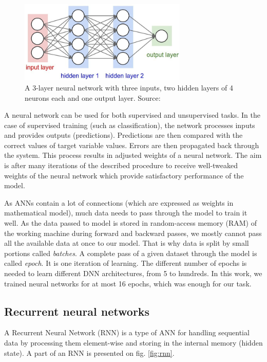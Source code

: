 \begin{figure}[h]
    \centering
    \includegraphics[width=8cm]{Images/Neural-network.jpg}
    \caption{A 3-layer neural network with three inputs, two hidden layers of 4 neurons each and one output layer. Source: \citep{FeiFei-2016}}
    \label{fig:neural-net}
\end{figure} 

A neural network can be used for both supervised and unsupervised tasks. In the case of supervised training (such as classification), the network processes inputs and provides outputs (predictions). Predictions are then compared with the correct values of target variable values. Errors are then propagated back through the system. This process results in adjusted weights of a neural network. The aim is after many iterations of the described procedure to receive well-tweaked weights of the neural network which provide satisfactory performance of the model. 

As ANNs contain a lot of connections (which are expressed as weights in mathematical model), much data needs to pass through the model to train it well. As the data passed to model is stored in random-access memory (RAM) of the working machine during forward and backward passes, we mostly cannot pass all the available data at once to our model. That is why data is split by small portions called \textit{batches}. A complete pass of a given dataset through the model is called \textit{epoch}. It is one iteration of learning. The different number of epochs is needed to learn different DNN architectures, from 5 to hundreds. In this work, we trained neural networks for at most 16 epochs, which was enough for our task.

\subsection{Recurrent neural networks}
\label{sec:rnn}
A Recurrent Neural Network (RNN) is a type of ANN for handling sequential data by processing them element-wise and storing in the internal memory (hidden state). A part of an RNN is presented on fig. \ref{fig:rnn}.

